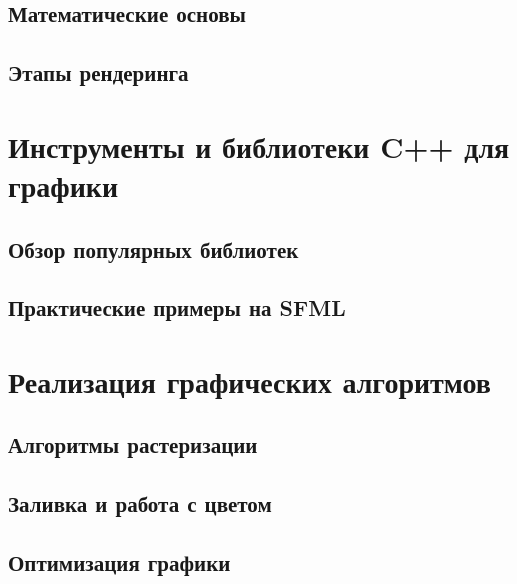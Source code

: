 \documentclass[referat]{SCWorks}
\begin{document}
\subsection{Математические основы}


\subsection{Этапы рендеринга}


\section{Инструменты и библиотеки C++ для графики}

\subsection{Обзор популярных библиотек}



\subsection{Практические примеры на SFML}



\section{Реализация графических алгоритмов}

\subsection{Алгоритмы растеризации}


\subsection{Заливка и работа с цветом}


\subsection{Оптимизация графики}


\conclusion






\appendix

\section{}


\end{document}

